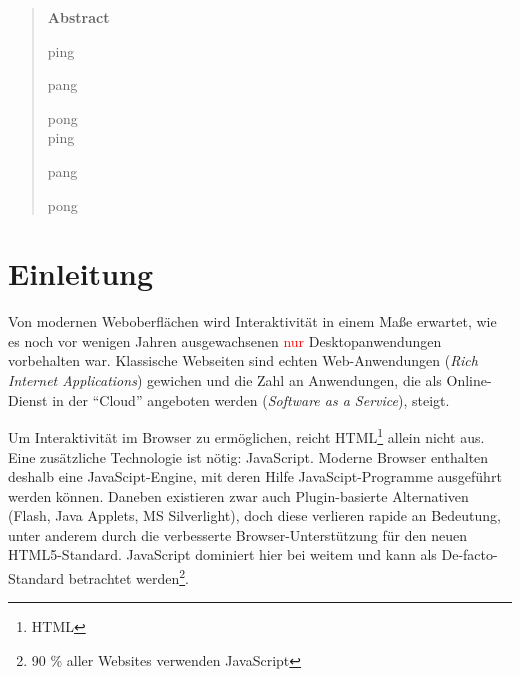 \documentclass[a4paper, 12pt, hidelinks, listof=totoc, listoftables=totoc, bibliography=totoc]{scrreprt}
\newcommand{\TODO}[1]{\textcolor{red}{#1}\newline}
\begin{document}


\pagestyle{empty} %


\begin{abstract}

\Large
	\textbf{Abstract}

\normalsize


ping

pang

pong \\


ping

pang

pong
\end{abstract}


\pagestyle{scrheadings} %



\tableofcontents

\newpage


\chapter{Einleitung}



Von modernen Weboberflächen wird Interaktivität in einem Maße erwartet, wie es noch vor wenigen Jahren ausgewachsenen \TODO{nur} Desktopanwendungen vorbehalten war. Klassische Webseiten sind echten Web-Anwendungen (\emph{Rich Internet Applications}) gewichen und die Zahl an Anwendungen, die als Online-Dienst in der "`Cloud"' angeboten werden (\emph{Software as a Service}), steigt.


Um Interaktivität im Browser zu ermöglichen, reicht HTML\footnote{\ac{HTML}} allein nicht aus. Eine zusätzliche Technologie ist nötig: JavaScript. Moderne Browser enthalten deshalb eine JavaScipt-Engine, mit deren Hilfe JavaScipt-Programme ausgeführt werden können. Daneben existieren zwar auch Plugin-basierte Alternativen (Flash, Java Applets, MS Silverlight), doch diese verlieren rapide an Bedeutung, unter anderem durch die verbesserte Browser-Unterstützung für den neuen HTML5-Standard. JavaScript dominiert hier bei weitem und kann als De-facto-Standard betrachtet werden\footnote{90 \% aller Websites verwenden JavaScript\cite{w3techs.CLI}}.
\end{document}
